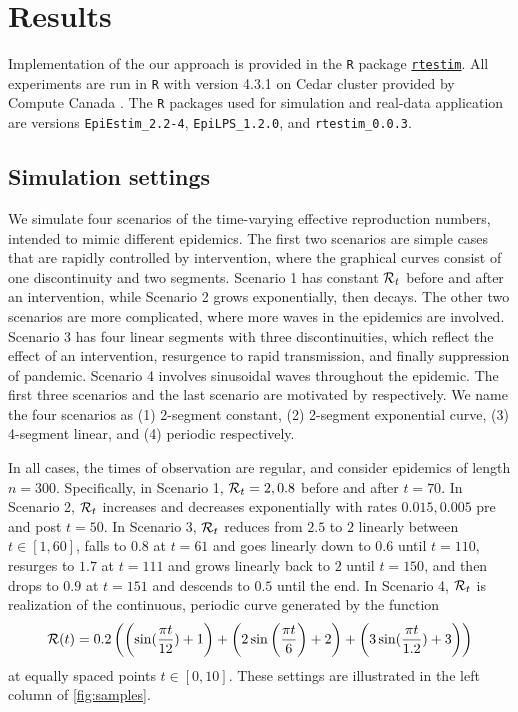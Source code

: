 \section{Results}

Implementation of the our approach is provided in the \texttt{R} package
\href{https://dajmcdon.github.io/rtestim/}{\texttt{rtestim}}. All experiments
are run in \texttt{R} with version 4.3.1 on Cedar cluster provided by Compute
Canada .
The \texttt{R} packages used for simulation and real-data application are
versions \texttt{EpiEstim\_2.2-4}, \texttt{EpiLPS\_1.2.0}, and
\texttt{rtestim\_0.0.3}. 


\subsection{Simulation settings}

We simulate four scenarios of the time-varying effective reproduction numbers,
intended to mimic different epidemics. The first two scenarios are simple cases
that are rapidly controlled by intervention, where the graphical curves consist
of one discontinuity and two segments. Scenario 1 has constant $\mathcal{R}_t$ before
and after an intervention, while Scenario 2 grows exponentially, then decays.
The other two scenarios are more complicated, where more waves in the epidemics
are involved. Scenario 3 has four linear segments with three discontinuities,
which reflect the effect of an intervention, resurgence to rapid transmission,
and finally suppression of pandemic. Scenario 4 involves sinusoidal waves
throughout the epidemic.
The first three scenarios and the last scenario are motivated by
\citep{parag2021improved, gressani2022epilps} respectively. 
We name the four scenarios as (1) 2-segment constant, (2) 2-segment exponential curve, (3) 4-segment linear, and (4) periodic respectively. 

In all cases, the times of observation are regular, and consider epidemics of
length $n=300$. Specifically, in Scenario 1, $\mathcal{R}_t = 2, 0.8$ before and after
$t=70$. In Scenario 2, $\mathcal{R}_t$ increases and decreases exponentially with
rates $0.015, 0.005$ pre and post $t=50$. In Scenario 3, $\mathcal{R}_t$ reduces from
$2.5$ to $2$ linearly between $t\in[1,60]$, falls to $0.8$ at $t=61$ and goes
linearly down to $0.6$ until $t=110$, resurges to $1.7$ at $t=111$ and grows
linearly back to $2$ until $t=150$, and then drops to $0.9$ at $t=151$ and
descends to $0.5$ until the end. In Scenario 4, $\mathcal{R}_t$ is realization of the
continuous, periodic curve generated by the function $$\mathcal{R}(t) = 0.2 \left(
\left(\sin(\frac{\pi t}{12}) + 1\right) + \left(2 \sin\left(\frac{\pi t}{6}\right) + 2\right) + \left(3
\sin(\frac{\pi t}{1.2}) + 3\right) \right)$$ at equally spaced points $t\in [0,10]$. These
settings are illustrated in the left column of \autoref{fig:samples}.


